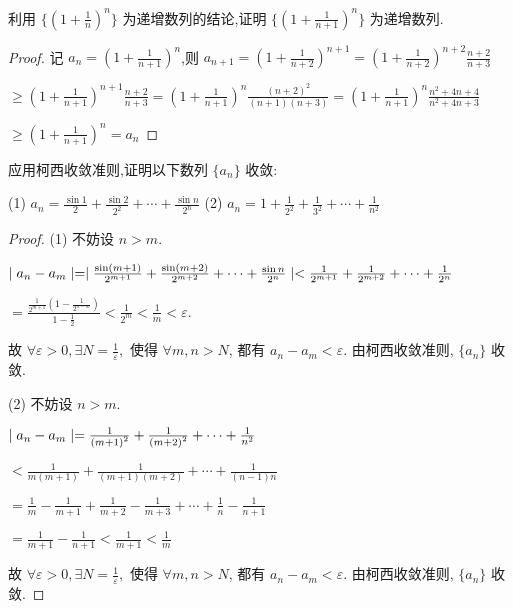 \begin{practice}
    利用 $\{(1+\frac{1}{n})^n\}$ 为递增数列的结论,证明 $\{(1+\frac{1}{n+1})^n\}$ 为递增数列.
\end{practice}

\begin{proof}
    记 $a_n=(1+\frac{1}{n+1})^n$,则 $a_{n+1}=(1+\frac{1}{n+2})^{n+1}=(1+\frac{1}{n+2})^{n+2}\frac{n+2}{n+3}$

    $\ge (1+\frac{1}{n+1})^{n+1}\frac{n+2}{n+3} =(1+\frac{1}{n+1})^n\frac{(n+2)^2}{(n+1)(n+3)}=(1+\frac{1}{n+1})^n\frac{n^2+4n+4}{n^2+4n+3}$
    
    $\ge (1+\frac{1}{n+1})^n = a_n$
\end{proof}

\begin{practice}
    应用柯西收敛准则,证明以下数列 $\{a_n\}$ 收敛:

    (1) $a_n=\frac{\sin 1}{2}+\frac{\sin 2}{2^2}+\cdots+\frac{\sin n}{2^n}$ 
    \qquad 
    (2) $a_n=1+\frac{1}{2^2}+\frac{1}{3^2}+\cdots+\frac{1}{n^2}$
\end{practice}

\begin{proof}
    (1) 不妨设 $n>m$.
    
    $\mid a_n-a_m \mid=\mid \frac{\sin (m+1)}{2^{m+1}}+\frac{\sin (m+2)}{2^{m+2}}+\cdots+\frac{\sin n}{2^n} \mid<\frac{1}{2^{m+1}}+\frac{1}{2^{m+2}}+\cdots+\frac{1}{2^n}$

    $=\frac{\frac{1}{2^{m+1}}(1-\frac{1}{2^{n-m}})}{1-\frac{1}{2}}<\frac{1}{2^{m}}<\frac{1}{m}<\varepsilon$.

    故 $\forall \varepsilon>0,\exists N=\frac{1}{\varepsilon},$ 使得 $\forall m,n>N$, 都有 $a_n-a_m<\varepsilon$. 由柯西收敛准则, $\{a_n\}$ 收敛.

    (2) 不妨设 $n>m$. 

    $\mid a_n-a_m \mid=\frac{1}{{(m+1)}^2}+\frac{1}{{(m+2)}^2}+\cdots+\frac{1}{n^2}$
    
    $<\frac{1}{m(m+1)}+\frac{1}{(m+1)(m+2)}+\cdots+\frac{1}{(n-1)n}$

    $=\frac{1}{m}-\frac{1}{m+1}+\frac{1}{m+2}-\frac{1}{m+3}+\cdots+\frac{1}{n}-\frac{1}{n+1}$

    $=\frac{1}{m+1}-\frac{1}{n+1}<\frac{1}{m+1}<\frac{1}{m}$

    故 $\forall \varepsilon>0,\exists N=\frac{1}{\varepsilon},$ 使得 $\forall m,n>N$, 都有 $a_n-a_m<\varepsilon$. 由柯西收敛准则, $\{a_n\}$ 收敛.
\end{proof}

